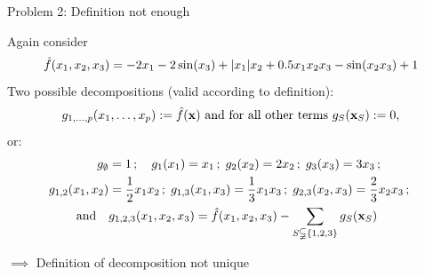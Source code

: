 \documentclass[10pt,compress,t,notes=noshow, xcolor=table]{beamer}
\begin{document}
\begin{frame}{Problem 2: Definition not enough}

    \begin{example}
        Again consider
        $$
        \hat{f}(x_1, x_2, x_3) = - 2x_1 - 2\sin(x_3) + |x_1|x_2 + 0.5 x_1 x_2 x_3 - \sin(x_2 x_3) + 1
        $$
        \pause
        Two possible decompositions (valid according to definition):
        $$
            g_{1, \dots, p}(x_1, \dots, x_p) := \hat{f}(\mathbf{x}) \text{ and for all other terms } g_S(\mathbf{x}_S) := 0 ,
        $$
        or:
        \begin{align*}
            g_\emptyset & = 1 \,;\quad
            g_1(x_1) = x_1 \,;\;
            g_2(x_2) = 2x_2 \,;\;
            g_3(x_3) = 3x_3 \,;\quad \\
            g_{1,2}(x_1, x_2) & = \frac{1}{2} x_1 x_2 \,;\;
            g_{1,3}(x_1, x_3) = \frac{1}{3} x_1 x_3 \,;\;
            g_{2,3}(x_2, x_3) = \frac{2}{3} x_2 x_3 \,;\; \\
            \text{ and} \quad
            & g_{1,2,3}(x_1, x_2, x_3) = \hat{f}(x_1, x_2, x_3) - \sum_{S \subsetneqq \{1,2,3\}} g_S(\mathbf{x}_S)
        \end{align*}
    \end{example}
    \pause
    \(\implies\) Definition of decomposition not unique \\
    
\end{frame}
\end{document}
